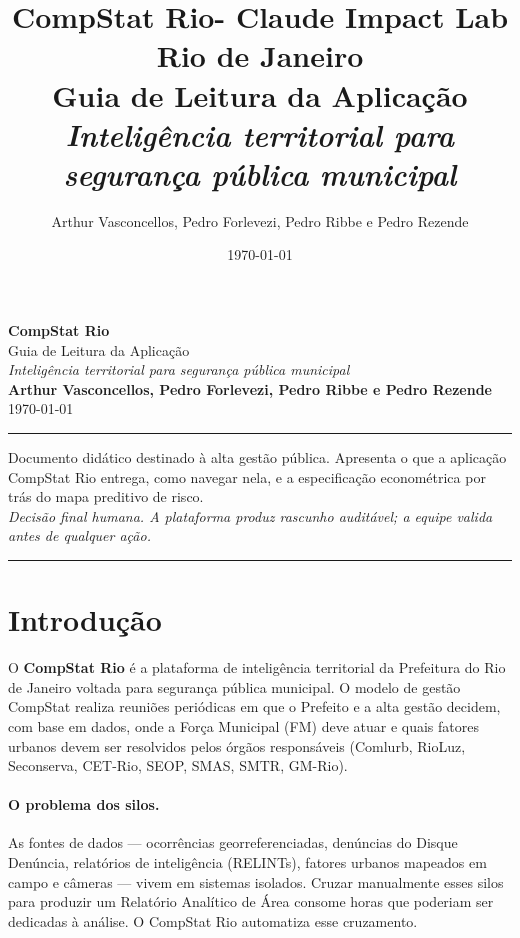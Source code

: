 \documentclass[11pt,a4paper]{article}
\title{%
  \textbf{CompStat Rio- Claude Impact Lab Rio de Janeiro} \\[0.4em]
  \large{Guia de Leitura da Aplicação} \\[0.3em]
  \normalsize\itshape Inteligência territorial para segurança pública municipal
}
\author{Arthur Vasconcellos, Pedro Forlevezi, Pedro Ribbe e Pedro Rezende}
\date{\today}
\begin{document}
\begin{titlepage}
  \centering
  \vspace*{2cm}
  {\Huge \textbf{CompStat Rio}} \\[0.6cm]
  {\Large Guia de Leitura da Aplicação} \\[0.4cm]
  {\large\itshape Inteligência territorial para segurança pública municipal} \\[2cm]

  {\large \textbf{Arthur Vasconcellos, Pedro Forlevezi, Pedro Ribbe e Pedro Rezende}} \\[0.3cm]
  {\large \today}
  \vfill
  \noindent\rule{\linewidth}{0.4pt}
  \begin{flushleft}
    \small
    Documento didático destinado à alta gestão pública. Apresenta o que a
    aplicação CompStat Rio entrega, como navegar nela, e a especificação
    econométrica por trás do mapa preditivo de risco. \\[0.3em]
    \emph{Decisão final humana. A plataforma produz rascunho auditável; a
    equipe valida antes de qualquer ação.}
  \end{flushleft}
  \noindent\rule{\linewidth}{0.4pt}
\end{titlepage}

\tableofcontents
\newpage

\section{Introdução}
\label{sec:introducao}

O \textbf{CompStat Rio} é a plataforma de inteligência territorial da
Prefeitura do Rio de Janeiro voltada para segurança pública municipal.
O modelo de gestão CompStat realiza reuniões periódicas em que o Prefeito
e a alta gestão decidem, com base em dados, onde a Força Municipal (FM)
deve atuar e quais fatores urbanos devem ser resolvidos pelos órgãos
responsáveis (Comlurb, RioLuz, Seconserva, CET-Rio, SEOP, SMAS, SMTR,
GM-Rio).

\paragraph{O problema dos silos.} As fontes de dados — ocorrências
georreferenciadas, denúncias do Disque Denúncia, relatórios de
inteligência (RELINTs), fatores urbanos mapeados em campo e câmeras —
vivem em sistemas isolados. Cruzar manualmente esses silos para produzir
um Relatório Analítico de Área consome horas que poderiam ser dedicadas à
análise. O CompStat Rio automatiza esse cruzamento.
\end{document}
